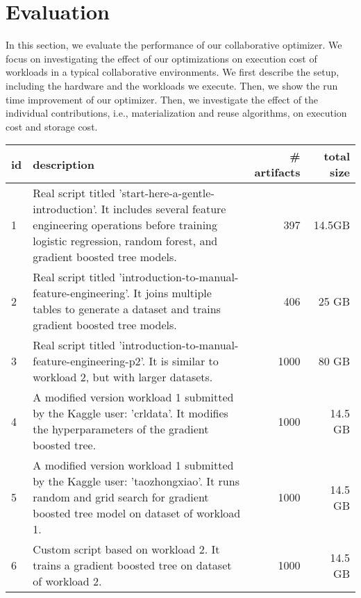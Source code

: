 \section{Evaluation} \label{sec-evaluation} 
In this section, we evaluate the performance of our collaborative optimizer.
We focus on investigating the effect of our optimizations on execution cost of workloads in a typical collaborative environments.
We first describe the setup, including the hardware and the workloads we execute.
Then, we show the run time improvement of our optimizer.
Then, we investigate the effect of the individual contributions, i.e., materialization and reuse algorithms, on execution cost and storage cost.
\begin{table*}[t]
\begin{tabular}{lp{}rr}
\textbf{id} & \textbf{description}& \textbf{\# artifacts}& \textbf{total size}   \\
\hline
1 &  \parbox[c][][t]{0.75\textwidth}{\linespread{0.5}\selectfont Real script titled 'start-here-a-gentle-introduction'. It includes several feature engineering operations before training logistic regression, random forest, and gradient boosted tree models.} & 397 & 14.5GB \\[0.3cm]

2 &   \parbox{0.75\textwidth}{\linespread{0.5}\selectfont Real script titled 'introduction-to-manual-feature-engineering'. It joins multiple tables to generate a dataset and trains gradient boosted tree models.} & 406 & 25 GB\\[0.3cm]

3 &   \parbox{0.75\textwidth}{\linespread{0.5}\selectfont Real script titled 'introduction-to-manual-feature-engineering-p2'. It is similar to workload 2, but with larger datasets.} & 1000 & 80 GB\\[0.3cm]

4 & \parbox{0.75\textwidth}{\linespread{0.5}\selectfont A modified version workload 1 submitted by the Kaggle user: 'crldata'. It modifies the hyperparameters of the gradient boosted tree.} & 1000 & 14.5 GB\\[0.3cm]

5 & \parbox{0.75\textwidth}{\linespread{0.5}\selectfont A modified version workload 1 submitted by the Kaggle user: 'taozhongxiao'. It runs random and grid search for gradient boosted tree model on dataset of workload 1.} & 1000 & 14.5 GB\\[0.3cm]

6 & \parbox{0.75\textwidth}{\linespread{0.5}\selectfont Custom script based on workload 2. It trains a gradient boosted tree on dataset of workload 2.} & 1000 & 14.5 GB\\[0.3cm]


\end{tabular}
\end{table*}
